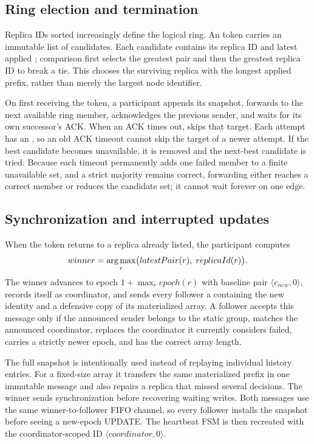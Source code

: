 \subsection{Ring election and termination}

Replica IDs sorted increasingly define the logical ring. An  token carries an immutable list of candidates. Each candidate contains its replica ID and latest applied ; comparison first selects the greatest pair and then the greatest replica ID to break a tie. This chooses the surviving replica with the longest applied prefix, rather than merely the largest node identifier.

On first receiving the token, a participant appends its snapshot, forwards to the next available ring member, acknowledges the previous sender, and waits for its own successor's ACK. When an ACK times out,  skips that target. Each attempt has an , so an old ACK timeout cannot skip the target of a newer attempt. If the best candidate becomes unavailable, it is removed and the next-best candidate is tried. Because each timeout permanently adds one failed member to a finite unavailable set, and a strict majority remains correct, forwarding either reaches a correct member or reduces the candidate set; it cannot wait forever on one edge.

\clearpage
\subsection{Synchronization and interrupted updates}

When the token returns to a replica already listed, the participant computes
\[
 winner=\operatorname*{arg\,max}_{r}\bigl(latestPair(r),\; replicaId(r)\bigr).
\]
The winner advances to epoch $1+\max_r epoch(r)$ with baseline pair $\langle e_{new},0\rangle$, records itself as coordinator, and sends every follower a  containing the new identity and a defensive copy of its materialized array. A follower accepts this message only if the announced sender belongs to the static group, matches the announced coordinator, replaces the coordinator it currently considers failed, carries a strictly newer epoch, and has the correct array length.

The full snapshot is intentionally used instead of replaying individual history entries. For a fixed-size array it transfers the same materialized prefix in one immutable message and also repairs a replica that missed several decisions. The winner sends synchronization before recovering waiting writes. Both messages use the same winner-to-follower FIFO channel, so every follower installs the snapshot before seeing a new-epoch UPDATE. The heartbeat FSM is then recreated with the coordinator-scoped ID $\langle coordinator,0\rangle$.


